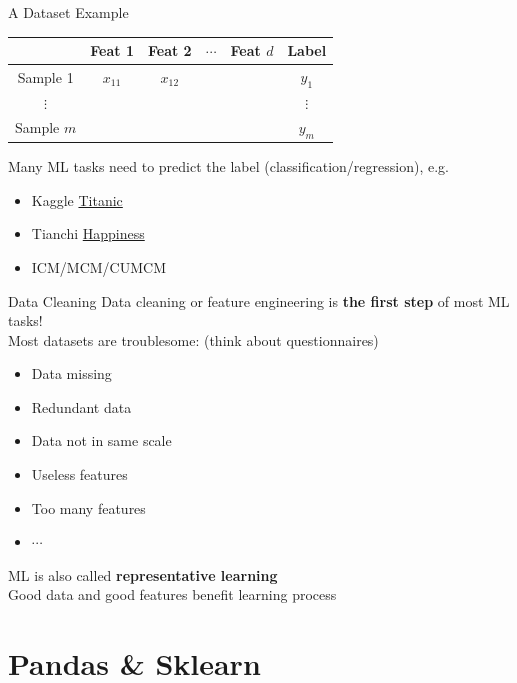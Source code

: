 \documentclass{../TexTemplate/myslide}
\begin{document}
\begin{frame}{A Dataset Example}
\begin{center}
\begin{tabular}{cccccc}\hline
 & Feat 1 & Feat 2 & $\cdots$ & Feat $d$ & Label\\\hline
Sample 1 & $x_{11}$ & $x_{12}$ & & & $y_1$ \\\hline
$\vdots$ & & & & & $\vdots$\\\hline
Sample $m$ & & & & & $y_m$ \\\hline
\end{tabular}
\end{center}
Many ML tasks need to predict the label (classification/regression), e.g.
\begin{itemize}
	\item Kaggle \href{https://www.kaggle.com/c/titanic}{Titanic}
	\item Tianchi \href{https://tianchi.aliyun.com/competition/entrance/231702/introduction?spm=5176.12281973.1005.6.3dd524483PJS4q}{Happiness}
	\item ICM/MCM/CUMCM
\end{itemize}
\end{frame}

\begin{frame}{Data Cleaning}
Data cleaning or feature engineering is \textbf{the first step} of most ML tasks!\\
Most datasets are troublesome: (think about questionnaires)
\begin{itemize}
	\item Data missing
	\item Redundant data
	\item Data not in same scale
	\item Useless features
	\item Too many features
	\item $\cdots$
\end{itemize}
ML is also called \textbf{representative learning}\\
Good data and good features benefit learning process
\end{frame}

\section{Pandas \& Sklearn}
\begin{frame}
\sectionpage
\end{frame}
\end{document}
